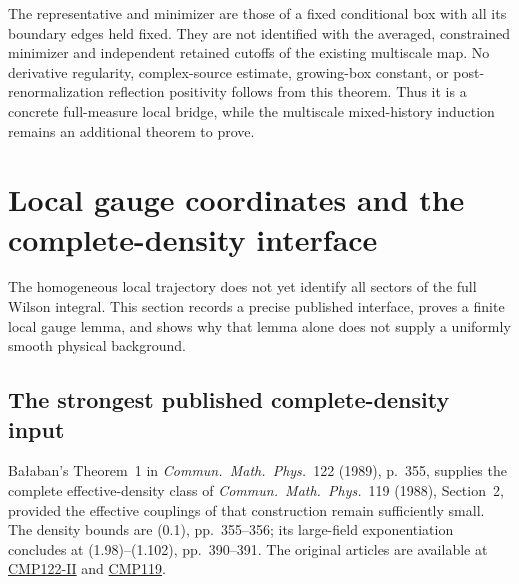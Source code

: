 \documentclass[11pt]{article}
\theoremstyle{remark}
\begin{document}
The representative and minimizer are those of a fixed conditional
box with all its boundary edges held fixed. They are not identified
with the averaged, constrained minimizer and independent retained
cutoffs of the existing multiscale map. No derivative regularity,
complex-source estimate, growing-box constant, or post-renormalization
reflection positivity follows from this theorem. Thus it is a
concrete full-measure local bridge, while the multiscale mixed-history
induction remains an additional theorem to prove.


\section{Local gauge coordinates and the complete-density interface}
\label{fmg-section}

The homogeneous local trajectory does not yet identify all sectors
of the full Wilson integral. This section records a precise published
interface, proves a finite local gauge lemma, and shows why that
lemma alone does not supply a uniformly smooth physical background.

\subsection{The strongest published complete-density input}
\label{fmg-source}

Ba{\l}aban's Theorem~1 in \emph{Commun.\ Math.\ Phys.}\ 122
(1989), p.~355, supplies the complete effective-density class of
\emph{Commun.\ Math.\ Phys.}\ 119 (1988), Section~2, provided the
effective couplings of that construction remain sufficiently small.
The density bounds are (0.1), pp.~355--356; its large-field
exponentiation concludes at (1.98)--(1.102), pp.~390--391.
The original articles are available at
\href{https://scispace.com/pdf/large-field-renormalization-ii-localization-exponentiation-h8b7ih93xo.pdf}
{CMP122-II} and
\href{https://scispace.com/pdf/convergent-renormalization-expansions-for-lattice-gauge-29jyexd38e.pdf}
{CMP119}.
\end{document}
